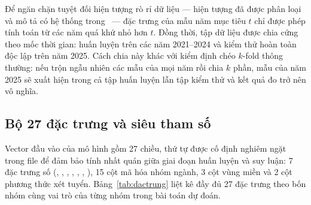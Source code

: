 Để ngăn chặn tuyệt đối hiện tượng rò rỉ dữ liệu  --- hiện
tượng đã được phân loại và mô tả có hệ thống trong~\cite{Kaufman2012} --- đặc
trưng của mẫu năm mục tiêu $t$ chỉ được phép tính toán từ các năm quá khứ nhỏ
hơn $t$. Đồng thời, tập dữ liệu được chia cứng theo mốc thời gian: huấn luyện
trên các năm 2021--2024 và kiểm thử hoàn toàn độc lập trên năm 2025. Cách chia
này khác với kiểm định chéo $k$-fold thông thường: nếu trộn ngẫu nhiên các mẫu
của mọi năm rồi chia $k$ phần, mẫu của năm 2025 sẽ xuất hiện trong cả tập huấn
luyện lẫn tập kiểm thử và kết quả đo trở nên vô nghĩa.

\subsection{Bộ 27 đặc trưng và siêu tham số}

Vector đầu vào của mô hình gồm 27 chiều, thứ tự được cố định nghiêm ngặt trong file  để đảm bảo tính nhất quán giữa giai đoạn huấn luyện và suy luận: 7 đặc trưng số (, , , , , , ), 15 cột mã hóa  nhóm ngành, 3 cột vùng miền và 2 cột phương thức xét tuyển. Bảng~\ref{tab:dactrung} liệt kê đầy đủ 27 đặc trưng theo bốn nhóm cùng vai trò của từng nhóm trong bài toán dự đoán.

